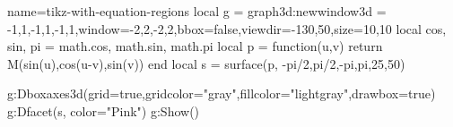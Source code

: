 \documentclass[border=5pt]{standalone}%
\begin{document}
\begin{luadraw}{name=tikz-with-equation-regions}
local g = graph3d:new{window3d = {-1,1,-1,1,-1,1},window={-2,2,-2,2},bbox=false,viewdir={-130,50},size={10,10}}
local cos, sin, pi = math.cos, math.sin, math.pi
local  p = function(u,v) return M(sin(u),cos(u-v),sin(v)) end
local s = surface(p, -pi/2,pi/2,-pi,pi,{25,50})

g:Dboxaxes3d({grid=true,gridcolor="gray",fillcolor="lightgray",drawbox=true})
g:Dfacet(s, {color="Pink"})
g:Show()
\end{luadraw}
\end{document}
